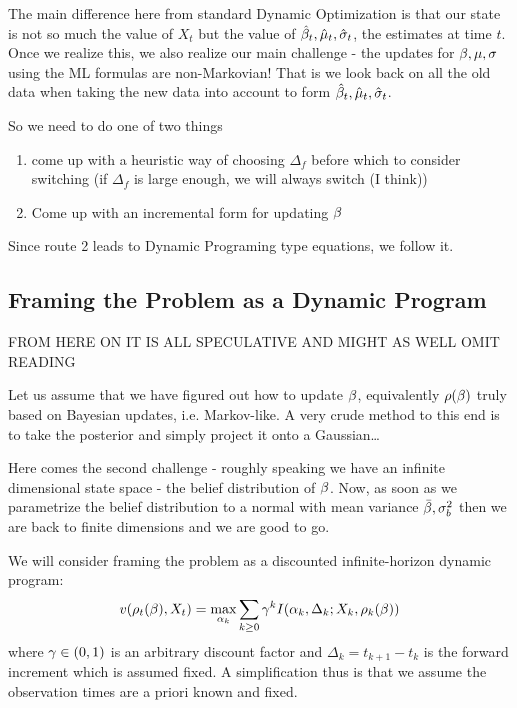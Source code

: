 \documentclass{article}
\begin{document}
The main difference here from standard Dynamic Optimization is
that our state is not so much the value of $X_t$ but the value of $\hat {{\beta}}_t,
\hat {{\mu }}_t, \hat {{\sigma }}_t$, the estimates at time $t$. Once we realize this, we also
realize our main challenge - the updates for ${\beta}, {\mu }, {\sigma }$ using the ML
formulas are non-Markovian! That is we look back on all the old
data when taking the new data into account to form $\hat {{\beta}}_t, \hat {{\mu }}_t, \hat
{{\sigma }}_t$. 

So we need to do one of two things
\begin{enumerate} 
  \item come up with a heuristic way of choosing $\Delta_f$ before which to
  consider switching (if $\Delta_f$ is large enough, we will always switch (I
  think))
  \item Come up with an incremental form for updating ${\beta}$
\end{enumerate}

Since route 2 leads to Dynamic Programing type equations, we follow it. 

\subsection{Framing the Problem as a Dynamic Program}
FROM HERE ON IT IS ALL SPECULATIVE AND MIGHT AS WELL OMIT READING

Let us assume that we have figured out how to update ${\beta}$, equivalently
$\rho({\beta})$ truly based on Bayesian updates, i.e. Markov-like. A very crude
method to this end is to take the posterior and simply project it onto a
Gaussian\ldots

Here comes the second challenge - roughly speaking we have an infinite
dimensional state space - the belief distribution of ${\beta}$. Now, as soon as we
parametrize the belief distribution to a normal with mean variance $\bar {{\beta}},
{\sigma }_b^2$ then we are back to finite dimensions and we are good to go. 

We will consider framing the problem as a discounted infinite-horizon dynamic
program:
\begin{equation}
v(\rho_t({\beta}), X_t) = \max_{{\alpha}_k} \sum_{k \geq 0} {\gamma }^k  I({\alpha}_k, \Delta_k;
X_k, \rho_k({\beta}))
\end{equation}
where ${\gamma } \in (0,1)$ is an arbitrary discount factor and $\Delta_k = t_{k+1} -
t_k$ is the forward increment which is assumed fixed. A simplification thus is
that we assume the observation times are a priori known and fixed.
\end{document}
